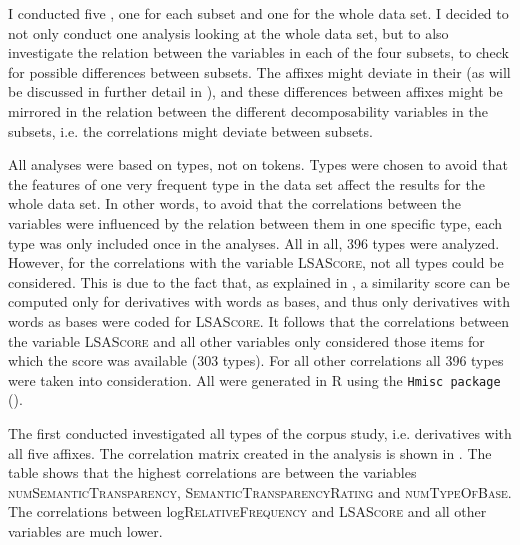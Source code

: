 I conducted five , one for each subset and one for the whole data set. 
I decided to not only conduct one analysis looking at the whole data set, but to also investigate the relation between the variables in each of the four subsets, to check for possible differences between subsets. The affixes might deviate in their  (as will be discussed in further detail in ), and these differences between affixes might be mirrored in the relation between the different decomposability variables in the subsets, i.e. the correlations might deviate between subsets.

All analyses were based on types, not on tokens. Types were chosen to avoid that the  features of one very frequent type in the data set affect the results for the whole data set. In other words, to avoid that the correlations between the variables were influenced by the relation between them in one specific type, each type was only included once in the analyses. 
All in all, 396 types were analyzed. However, for the correlations with the variable \textsc{LSAScore}, not all types could be considered. This is due to the fact that, as explained in , a similarity score can be computed only for derivatives with words as bases, and thus only derivatives with words as bases were coded for \textsc{LSAScore}. It follows that the correlations between the variable \textsc{LSAScore} and all other variables only considered those items for which the score was available (303 types). For all other correlations all 396 types were taken into consideration. 
All  were generated in R using the \texttt{Hmisc package} (\citealt{Harrell.2017}).

The first  conducted investigated all types of the corpus study, i.e. derivatives with all five affixes. The correlation matrix created in the analysis is shown in . The table shows that the highest correlations are between the variables \textsc{numSemanticTransparency}, \textsc{SemanticTransparencyRating} and \textsc{numTypeOfBase}. The correlations between log\textsc{RelativeFrequency} and \textsc{LSAScore} and all other variables are much lower. 



